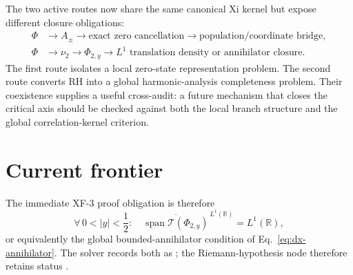 The two active routes now share the same canonical Xi kernel but expose different closure obligations:
\begin{align}
\Phi
&\longrightarrow A_\pm
\longrightarrow \text{exact zero cancellation}
\longrightarrow \text{population/coordinate bridge},\\
\Phi
&\longrightarrow \nu_2
\longrightarrow \Phi_{2,y}
\longrightarrow \text{$L^1$ translation density or annihilator closure}.
\end{align}
The first route isolates a local zero-state representation problem.  The second route converts RH into a global harmonic-analysis completeness problem.  Their coexistence supplies a useful cross-audit: a future mechanism that closes the critical axis should be checked against both the local branch structure and the global correlation-kernel criterion.

\section{Current frontier}

The immediate XF-3 proof obligation is therefore
\begin{equation}\label{eq:xf3-frontier}
\boxed{
\forall\,0<|y|<\frac12:\quad
\overline{\operatorname{span}\mathcal T(\Phi_{2,y})}^{\,L^1(\mathbb R)}
=L^1(\mathbb R),
}
\end{equation}
or equivalently the global bounded-annihilator condition of Eq.~\eqref{eq:dx-annihilator}.  The solver records both as ; the Riemann-hypothesis node therefore retains status .
